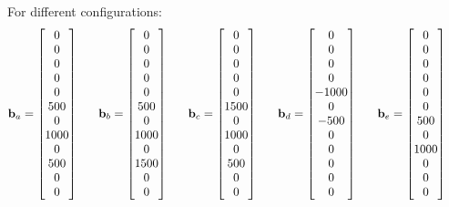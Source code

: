 \documentclass{article}
\begin{document}
For different configurations: \\
\begin{align*}
\vb_a = \bmat{0 \\ 0 \\ 0 \\ 0 \\ 0 \\ 500 \\  0 \\ 1000 \\ 0 \\ 500 \\ 0 \\ 0}\ \ \ \ \ 
\vb_b = \bmat{0 \\ 0 \\ 0 \\ 0 \\ 0 \\ 500 \\  0 \\ 1000 \\ 0 \\ 1500 \\ 0 \\ 0}\ \ \ \ \ 
\vb_c = \bmat{0 \\ 0 \\ 0 \\ 0 \\ 0 \\ 1500 \\  0 \\ 1000 \\ 0 \\ 500 \\ 0 \\ 0}\ \ \ \ \ 
\vb_d = \bmat{0 \\ 0 \\ 0 \\ 0 \\ -1000 \\ 0 \\  -500 \\ 0 \\ 0 \\ 0 \\ 0 \\ 0}\ \ \ \ \ 
\vb_e = \bmat{0 \\ 0 \\ 0 \\ 0 \\ 0 \\ 0 \\  500 \\ 0 \\ 1000 \\ 0 \\ 0 \\ 0}\ \ \ \ \ 
\end{align*}
\end{document}
